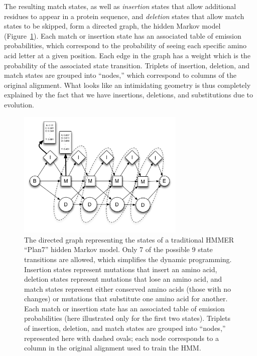 \documentclass[preprint,nocopyrightspace,times]{sigplanconf}
\begin{document}
The resulting match states, as well as \textit{insertion} states that allow 
additional residues to appear in a protein sequence, and \textit{deletion} 
states that allow match states to be skipped, form a directed graph, the hidden 
Markov model (Figure~\ref{plan7}). Each match or insertion state has an 
associated table of emission probabilities, which correspond to the probability 
of seeing each specific amino acid letter at a given position. Each edge in the 
graph has a weight which is the probability of the associated state transition. 
Triplets of insertion, deletion, and match states are grouped into ``nodes,'' 
which correspond to columns of the original alignment. What looks like an 
intimidating geometry is thus completely explained by the fact that we have 
insertions, deletions, and substitutions due to evolution.

\begin{figure} \centerline{\includegraphics[width=8cm]{Plan7.pdf}} \caption{The 
directed graph representing the states of a traditional HMMER ``Plan7'' hidden 
Markov model. Only 7 of the possible 9 state transitions are allowed, which 
simplifies the dynamic programming. Insertion states represent mutations that 
insert an amino acid, deletion states represent mutations that lose an amino 
acid, and match states represent either conserved amino acids (those with no 
changes) or mutations that substitute one amino acid for another. Each match or 
insertion state has an associated table of emission probabilities (here 
illustrated only for the first two states). Triplets of insertion, deletion, 
and match states are grouped into ``nodes,'' represented here with dashed 
ovals; each node corresponds to a column in the original alignment used to 
train the HMM.}\label{plan7} \end{figure}
\end{document}
